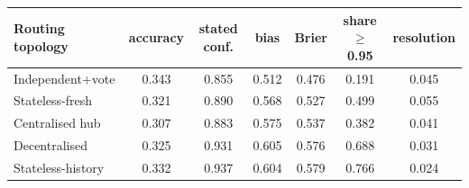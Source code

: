 \begin{tabular}{lcccccc}
\toprule
Routing topology & accuracy & stated conf. & bias & Brier & share $\ge$0.95 & resolution \\
\midrule
Independent+vote & 0.343 & 0.855 & 0.512 & 0.476 & 0.191 & 0.045 \\
Stateless-fresh & 0.321 & 0.890 & 0.568 & 0.527 & 0.499 & 0.055 \\
Centralised hub & 0.307 & 0.883 & 0.575 & 0.537 & 0.382 & 0.041 \\
Decentralised & 0.325 & 0.931 & 0.605 & 0.576 & 0.688 & 0.031 \\
Stateless-history & 0.332 & 0.937 & 0.604 & 0.579 & 0.766 & 0.024 \\
\bottomrule
\end{tabular}